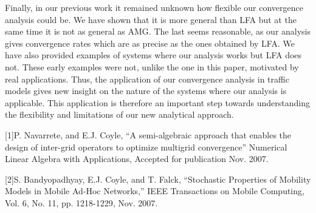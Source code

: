 \documentclass{report}
\begin{document}
Finally, in our previous work it remained unknown how flexible our
convergence analysis could be. We have shown that it is more general than
LFA but at the same time it is not as general as AMG. The last seems
reasonable, as our analysis gives convergence rates which are as precise
as the ones obtained by LFA. We have also provided examples of systems
where our analysis works but LFA does not. These early examples were not,
unlike the one in this paper, motivated by real applications. Thus, the
application of our convergence analysis in traffic models gives new
insight on the nature of the systems where our analysis is applicable.
This application is therefore an important step towards understanding the
flexibility and limitations of our new analytical approach.

[1]P. Navarrete, and E.J. Coyle, ``A semi-algebraic approach that enables
the design of inter-grid operators to optimize multigrid convergence''
Numerical Linear Algebra with Applications, Accepted for publication Nov.
2007.

[2]S. Bandyopadhyay, E.J. Coyle, and T. Falck, ``Stochastic Properties of
Mobility Models in Mobile Ad-Hoc Networks,'' IEEE Transactions on Mobile
Computing, Vol. 6, No. 11, pp. 1218-1229, Nov. 2007.
\end{document}
